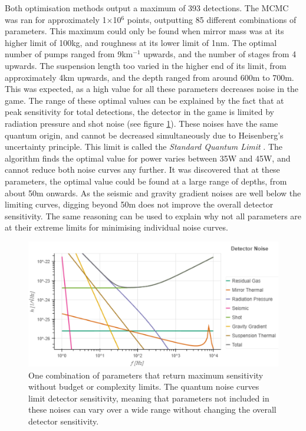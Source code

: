 \documentclass{article}
\begin{document}
Both optimisation methods output a maximum of 393 detections. The MCMC was ran for approximately 1$\times$10$^6$ points, outputting 85 different combinations of parameters. This maximum could only be found when mirror mass was at its higher limit of 100kg, and roughness at its lower limit of 1nm. The optimal number of pumps ranged from 9km$^{-1}$ upwards, and the number of stages from 4 upwards. The suspension length too varied in the higher end of its limit, from approximately 4km upwards, and the depth ranged from around 600m to 700m. This was expected, as a high value for all these parameters decreases noise in the game. The range of these optimal values can be explained by the fact that at peak sensitivity for total detections, the detector in the game is limited by radiation pressure and shot noise (see figure \ref{fig::SPQMaxNoLim}). These noises have the same quantum origin, and cannot be decreased simultaneously due to Heisenberg's uncertainty principle. This limit is called the \textit{Standard Quantum Limit} \cite{danilishin}. The algorithm finds the optimal value for power varies between 35W and 45W, and cannot reduce both noise curves any further. It was discovered that at these parameters, the optimal value could be found at a large range of depths, from about 50m onwards. As the seismic and gravity gradient noises are well below the limiting curves, digging beyond 50m does not improve the overall detector sensitivity. The same reasoning can be used to explain why not all parameters are at their extreme limits for minimising individual noise curves. 

\begin{figure}[h!]
    \centering
    \includegraphics[scale=0.55]{SPQMaxNoLim.pdf}
    \captionsetup{width=0.9\textwidth}
    \caption{One combination of parameters that return maximum sensitivity without budget or complexity limits. The quantum noise curves limit detector sensitivity, meaning that parameters not included in these noises can vary over a wide range without changing the overall detector sensitivity.}
    \label{fig::SPQMaxNoLim}
\end{figure}
\end{document}
